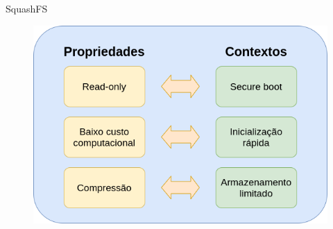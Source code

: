 \begin{frame}{SquashFS}
\begin{figure}
    \centering
    \includegraphics[scale=0.4]{figuras/squashfs_propriedades (1).png}
    \label{fig:my_label}
\end{figure}
\end{frame}
